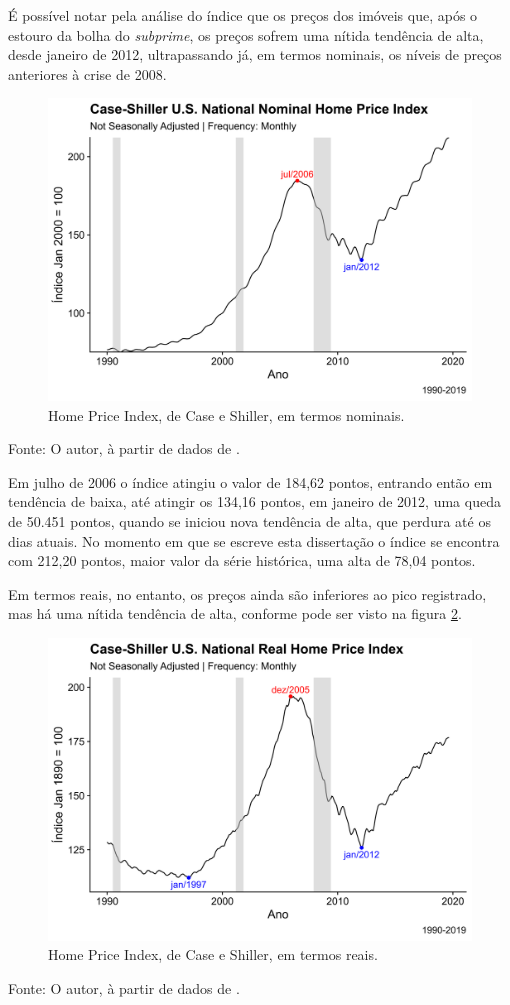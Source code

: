 \documentclass[
	12pt,				%
	oneside,			%
	a4paper,			%
	chapter=TITLE,		%
	section=TITLE,		%
	english,			%
	brazil				%
	]{abntex2}
\newcommand{\bcenter}{\begin{center}}
\newcommand{\ecenter}{\end{center}}
\begin{document}
É possível notar pela análise do índice que os preços dos imóveis que,
após o estouro da bolha do \emph{subprime}, os preços sofrem uma nítida
tendência de alta, desde janeiro de 2012, ultrapassando já, em termos
nominais, os níveis de preços anteriores à crise de 2008.
\begin{figure}[H]

{\centering \includegraphics[width=0.7\linewidth]{images/nhpi-1} 

}

\caption{Home Price Index, de Case e Shiller, em termos nominais.}\label{fig:nhpi}
\end{figure}
\bcenter
Fonte: O autor, à partir de dados de \textcite{QuandlWIKI}. \ecenter

Em julho de 2006 o índice atingiu o valor de 184,62 pontos, entrando
então em tendência de baixa, até atingir os 134,16 pontos, em janeiro de
2012, uma queda de 50.451 pontos, quando se iniciou nova tendência de
alta, que perdura até os dias atuais. No momento em que se escreve esta
dissertação o índice se encontra com 212,20 pontos, maior valor da série
histórica, uma alta de 78,04 pontos.

Em termos reais, no entanto, os preços ainda são inferiores ao pico
registrado, mas há uma nítida tendência de alta, conforme pode ser visto
na figura \ref{fig:rhpi}.
\begin{figure}[H]

{\centering \includegraphics[width=0.7\linewidth]{images/rhpi-1} 

}

\caption{Home Price Index, de Case e Shiller, em termos reais.}\label{fig:rhpi}
\end{figure}
\bcenter
Fonte: O autor, à partir de dados de \textcite{QuandlWIKI}. \ecenter
\end{document}
